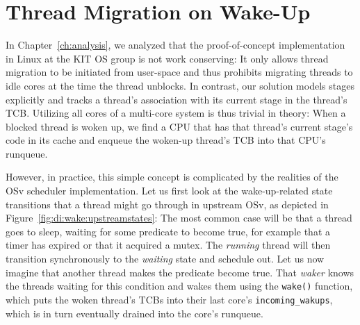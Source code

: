 \documentclass[12pt,a4paper]{book}
\begin{document}
\section{Thread Migration on Wake-Up}\label{ch:di:wake}
In Chapter~\ref{ch:analysis}, we analyzed that the proof-of-concept implementation in Linux at the KIT OS group is not work conserving:
It only allows thread migration to be initiated from user-space and thus prohibits migrating threads to idle cores at the time the thread unblocks.
In contrast, our solution models stages explicitly and tracks a thread's association with its current stage in the thread's TCB.
Utilizing all cores of a multi-core system is thus trivial in theory:
When a blocked thread is woken up, we find a CPU that has that thread's current stage's code in its cache and enqueue the woken-up thread's TCB into that CPU's runqueue.

However, in practice, this simple concept is complicated by the realities of the OSv scheduler implementation.
Let us first look at the wake-up-related state transitions that a thread might go through in upstream OSv, as depicted in Figure~\ref{fig:di:wake:upstreamstates}:
The most common case will be that a thread goes to sleep, waiting for some predicate to become true, for example that a timer has expired or that it acquired a mutex.
The \textit{running} thread will then transition synchronously to the \textit{waiting} state and schedule out.
Let us now imagine that another thread makes the predicate become true.
That \emph{waker} knows the threads waiting for this condition and wakes them using the \lstinline[style=figurecpp]{wake()} function, which puts the woken thread's TCBs into their last core's \lstinline[style=figurecpp]{incoming_wakups}, which is in turn eventually drained into the core's runqueue.
\end{document}
